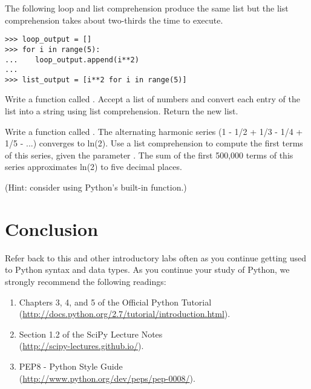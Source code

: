 The following  loop and list comprehension produce the same list but the list comprehension takes about two-thirds the time to execute.

\begin{lstlisting}
>>> loop_output = []
>>> for i in range(5):
...    loop_output.append(i**2)
...
>>> list_output = [i**2 for i in range(5)]
\end{lstlisting}

\begin{problem}
Write a function called .
Accept a list  of numbers and convert each entry of the list into a string using list comprehension.
Return the new list.
\end{problem}

\begin{problem}
Write a function called .
The alternating harmonic series (1 - 1/2 + 1/3 - 1/4 + 1/5 - ...) converges to ln(2).
Use a list comprehension to compute the first  terms of this series, given the parameter .
The sum of the first 500,000 terms of this series approximates ln(2) to five decimal places.

(Hint: consider using Python's built-in  function.)
\end{problem}

\section*{Conclusion}
Refer back to this and other introductory labs often as you continue getting used to Python syntax and data types.
As you continue your study of Python, we strongly recommend the following readings:
\begin{enumerate}
\item Chapters 3, 4, and 5 of the Official Python Tutorial \\
        (\url{http://docs.python.org/2.7/tutorial/introduction.html}).
\item Section 1.2 of the SciPy Lecture Notes\\
        (\url{http://scipy-lectures.github.io/}).
\item PEP8 - Python Style Guide \\
        (\url{http://www.python.org/dev/peps/pep-0008/}).
\end{enumerate}
